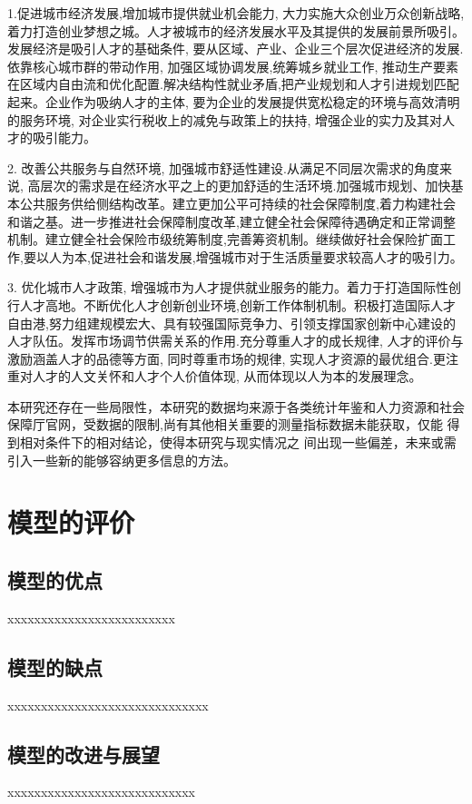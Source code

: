 \documentclass{whutmod}
\begin{document}
1.促进城市经济发展,增加城市提供就业机会能力, 大力实施大众创业万众创新战略,着力打造创业梦想之城。人才被城市的经济发展水平及其提供的发展前景所吸引。发展经济是吸引人才的基础条件, 要从区域、产业、企业三个层次促进经济的发展.依靠核心城市群的带动作用, 加强区域协调发展,统筹城乡就业工作, 推动生产要素在区域内自由流和优化配置.解决结构性就业矛盾,把产业规划和人才引进规划匹配起来。企业作为吸纳人才的主体, 要为企业的发展提供宽松稳定的环境与高效清明的服务环境, 对企业实行税收上的减免与政策上的扶持, 增强企业的实力及其对人才的吸引能力。

2. 改善公共服务与自然环境, 加强城市舒适性建设.从满足不同层次需求的角度来说, 高层次的需求是在经济水平之上的更加舒适的生活环境.加强城市规划、加快基本公共服务供给侧结构改革。建立更加公平可持续的社会保障制度,着力构建社会和谐之基。进一步推进社会保障制度改革,建立健全社会保障待遇确定和正常调整机制。建立健全社会保险市级统筹制度,完善筹资机制。继续做好社会保险扩面工作,要以人为本,促进社会和谐发展,增强城市对于生活质量要求较高人才的吸引力。

3. 优化城市人才政策, 增强城市为人才提供就业服务的能力。着力于打造国际性创行人才高地。不断优化人才创新创业环境,创新工作体制机制。积极打造国际人才自由港,努力组建规模宏大、具有较强国际竞争力、引领支撑国家创新中心建设的人才队伍。发挥市场调节供需关系的作用.充分尊重人才的成长规律, 人才的评价与激励涵盖人才的品德等方面, 同时尊重市场的规律, 实现人才资源的最优组合.更注重对人才的人文关怀和人才个人价值体现, 从而体现以人为本的发展理念。

本研究还存在一些局限性，本研究的数据均来源于各类统计年鉴和人力资源和社会保障厅官网，受数据的限制,尚有其他相关重要的测量指标数据未能获取，仅能 得到相对条件下的相对结论，使得本研究与现实情况之 间出现一些偏差，未来或需引入一些新的能够容纳更多信息的方法。




	\section{模型的评价}
	\subsection{模型的优点}
xxxxxxxxxxxxxxxxxxxxxxxxx
	
	\subsection{模型的缺点}
xxxxxxxxxxxxxxxxxxxxxxxxxxxxxx


	\subsection{模型的改进与展望}%
xxxxxxxxxxxxxxxxxxxxxxxxxxxx
	\newpage	%
	\nocite{*}		%
	\printbibliography[title = {参考文献}]	%
	
\end{document}
